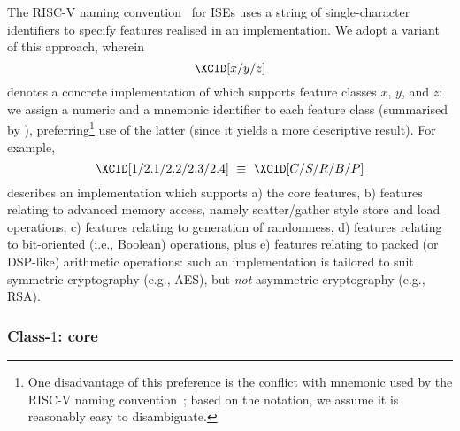 The RISC-V naming convention~\cite[Section 22]{SCARV:RV:ISA:I:17} for ISEs
uses a string of single-character identifiers to specify features realised
in an implementation.  We adopt a variant of this approach, wherein
\[
\XCID[x/y/z]
\]
denotes a concrete implementation of \XCID which supports feature classes 
$x$, $y$, and $z$: we assign a numeric and a mnemonic identifier to each
feature class (summarised by ), preferring\footnote{
One disadvantage of this preference is the conflict with mnemonic used by
the RISC-V naming convention~\cite[Section 22]{SCARV:RV:ISA:I:17}; based
on the notation, we assume it is reasonably easy to disambiguate.
} use of the latter (since it yields a more descriptive result).  
For example,
\[
\XCID[1/2.1/2.2/2.3/2.4] ~\equiv~ \XCID[C/S/R/B/P]
\]
describes an implementation which supports
a) the core features,
b) features relating to advanced memory access, namely scatter/gather
   style store and load operations,
c) features relating to generation of randomness,
d) features relating to bit-oriented (i.e., Boolean) operations,
   plus
e) features relating to packed (or DSP-like) arithmetic operations:
such an implementation is tailored to suit symmetric cryptography (e.g.,
AES), but {\em not} asymmetric cryptography (e.g., RSA).



\subsubsection{Class-$1$:   core}
\label{sec:bg:feature:1}


